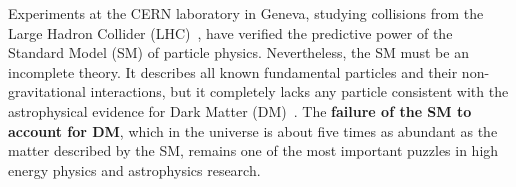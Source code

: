 Experiments at the CERN laboratory in Geneva, studying collisions from the Large Hadron Collider (LHC)~\cite{LHC2008}, have verified the predictive power of the Standard Model (SM) of particle physics. %
Nevertheless, the SM must be an incomplete theory.
It describes all known fundamental particles and their non-gravitational interactions,
but it completely lacks any particle consistent with the astrophysical evidence for Dark Matter (DM)~\cite{Bertone:2016nfn}.
The \textbf{failure of the SM to account for DM}, which in the universe is about five times as abundant as the matter described by the SM, remains one of the most important puzzles in high energy physics and astrophysics research.


